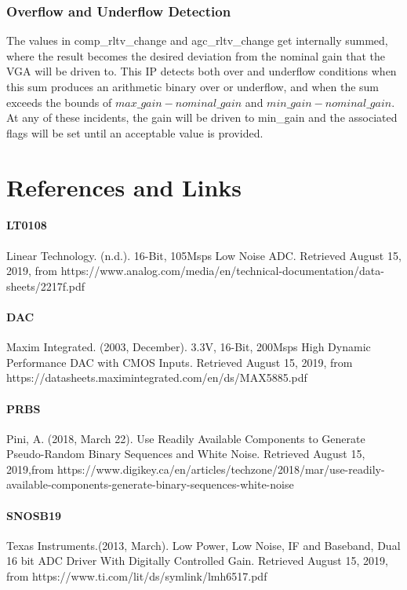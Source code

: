 \documentclass[11pt]{article}
\begin{document}
\subsubsection{Overflow and Underflow Detection}
The values in comp\_rltv\_change and agc\_rltv\_change get internally summed, where the result becomes the desired deviation from the nominal gain that
the VGA will be driven to. This IP detects both over and underflow conditions when this sum produces an arithmetic binary over or underflow, and when the
sum exceeds the bounds of $max\_gain-nominal\_gain$ and $min\_gain-nominal\_gain$. At any of these incidents, the gain will be driven to min\_gain and the
associated flags will be set until an acceptable value is provided.

\newpage
\section{References and Links}
\paragraph{LT0108}Linear Technology. (n.d.). 16-Bit, 105Msps Low Noise ADC. Retrieved August 15, 2019, 
from https://www.analog.com/media/en/technical-documentation/data-sheets/2217f.pdf
\paragraph{DAC}Maxim Integrated. (2003, December). 3.3V, 16-Bit, 200Msps High Dynamic Performance DAC with CMOS Inputs. Retrieved August 15, 2019,
from https://datasheets.maximintegrated.com/en/ds/MAX5885.pdf
\paragraph{PRBS} Pini, A. (2018, March 22). Use Readily Available Components to Generate Pseudo-Random Binary Sequences and White Noise. Retrieved August 
15, 2019,from https://www.digikey.ca/en/articles/techzone/2018/mar/use-readily-available-components-generate-binary-sequences-white-noise  
\paragraph{SNOSB19}Texas Instruments.(2013, March). Low Power, Low Noise, IF and Baseband, Dual 16 bit ADC Driver With Digitally Controlled Gain.
Retrieved August 15, 2019, from https://www.ti.com/lit/ds/symlink/lmh6517.pdf 
\end{document}
